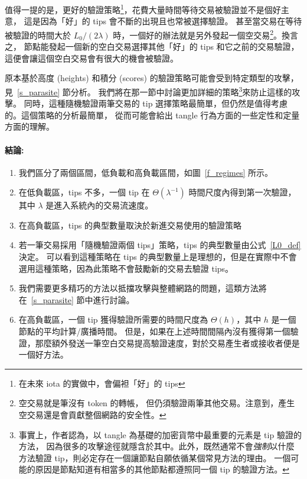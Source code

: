 \documentclass[12pt]{article}
\begin{document}
\begin{CJK}{UTF8}{bkai}
值得一提的是，更好的驗證策略\footnote{在未來 iota 的實做中，會偏袒「好」的 tips}，花費大量時間等待交易被驗證並不是個好主意，
這是因為「好」的 tips 會不斷的出現且也常被選擇驗證。
甚至當交易在等待被驗證的時間大於 $L_0/(2\lambda)$ 時，一個好的辦法就是另外發起一個空交易\footnote{空交易就是筆沒有 token 的轉帳，
但仍須驗證兩筆其他交易。注意到，產生空交易還是會貢獻整個網路的安全性。}。換言之，
節點能發起一個新的空白交易選擇其他「好」的 tips 和它之前的交易驗證，這便會讓這個空白交易會有很大的機會被驗證。

原本基於高度 (heights) 和積分 (scores) 的驗證策略可能會受到特定類型的攻擊，見~\ref{s_parasite} 節分析。
我們將在那一節中討論更加詳細的策略\footnote{事實上，作者認為，以 tangle 為基礎的加密貨幣中最重要的元素是 tip 驗證的方法，
因為很多的攻擊途徑就隱含於其中。此外，既然通常不會\emph{強制}以什麼方法驗證 tip，則必定存在一個讓節點自願依循某個常見方法的理由。
一個可能的原因是節點知道有相當多的其他節點都遵照同一個 tip 的驗證方法。}來防止這樣的攻擊。
同時，這種隨機驗證兩筆交易的 tip 選擇策略最簡單，但仍然是值得考慮的。這個策略的分析最簡單，
從而可能會給出 tangle 行為方面的一些定性和定量方面的理解。

\paragraph{結論:}
\begin{enumerate}
 \item 我們區分了兩個區間，低負載和高負載區間，如圖~\ref{f_regimes} 所示。
 \item 在低負載區，tips 不多，一個 tip 在 $\Theta(\lambda^{-1})$ 時間尺度內得到第一次驗證，
 其中 $\lambda$ 是進入系統內的交易流速度。
 \item 在高負載區，tips 的典型數量取決於新進交易使用的驗證策略
 \item 若一筆交易採用「隨機驗證兩個 tips」策略，tips 的典型數量由公式~\eqref{L0_def} 決定。
 可以看到這種策略在 tips 的典型數量上是理想的，但是在實際中不會選用這種策略，因為此策略不會鼓勵新的交易去驗證 tips。
 \item 我們需要更多精巧的方法以抵擋攻擊與整體網路的問題，這類方法將在~\ref{s_parasite} 節中進行討論。
 \item 在高負載區，一個 tip 獲得驗證所需要的時間尺度為 $\Theta(h)$，其中 $h$ 是一個節點的平均計算/廣播時間。
 但是，如果在上述時間間隔內沒有獲得第一個驗證，那麼額外發送一筆空白交易提高驗證速度，對於交易產生者或接收者便是一個好方法。
\end{enumerate}





\end{CJK}
\end{document}
